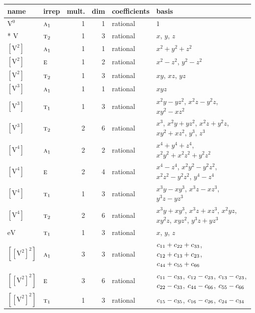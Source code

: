 \documentclass[10pt,a4paper]{article}
\numberwithin{equation}{section}
\newcommand{\irr}[1]{\text{\normalfont\scshape #1}}
\newcommand{\jahn}[1]{\mathrm{#1}}
\newlength{\fillwidth}\newlength{\cellwidth}\newlength{\colwidth}
\newcommand{\signbreak}{\penalty100\relax}
\begin{document}
{\begin{longtable}{@{}llrrl>{\RaggedRight\arraybackslash}p{\fillwidth}@{}}
name & irrep & mult. & dim & coefficients & basis\\\midrule\endhead
\bottomrule\endfoot\endlastfoot
$\jahn{V^{0}}$ & $\irr{a}_{1}$ & 1 & 1 & rational & $1$\\*
$\jahn{V}$ & $\irr{t}_{2}$ & 1 & 3 & rational & $x$, $y$, $z$\\
$\jahn{[V^{2}]}$ & $\irr{a}_{1}$ & 1 & 1 & rational & $x^{2} + y^{2} + z^{2}$\\
$\jahn{[V^{2}]}$ & $\irr{e}$ & 1 & 2 & rational & $x^{2} - z^{2}$, $y^{2} - z^{2}$\\
$\jahn{[V^{2}]}$ & $\irr{t}_{2}$ & 1 & 3 & rational & $xy$, $xz$, $yz$\\
$\jahn{[V^{3}]}$ & $\irr{a}_{1}$ & 1 & 1 & rational & $xyz$\\
$\jahn{[V^{3}]}$ & $\irr{t}_{1}$ & 1 & 3 & rational & $x^{2}y - yz^{2}$, $x^{2}z - y^{2}z$, $xy^{2} - xz^{2}$\\
$\jahn{[V^{3}]}$ & $\irr{t}_{2}$ & 2 & 6 & rational & $x^{3}$, $x^{2}y + yz^{2}$, $x^{2}z + y^{2}z$, $xy^{2} + xz^{2}$, $y^{3}$, $z^{3}$\\
$\jahn{[V^{4}]}$ & $\irr{a}_{1}$ & 2 & 2 & rational & $x^{4} + y^{4} + z^{4}$, $x^{2}y^{2} + x^{2}z^{2} + y^{2}z^{2}$\\
$\jahn{[V^{4}]}$ & $\irr{e}$ & 2 & 4 & rational & $x^{4} - z^{4}$, $x^{2}y^{2} - y^{2}z^{2}$, $x^{2}z^{2} - y^{2}z^{2}$, $y^{4} - z^{4}$\\
$\jahn{[V^{4}]}$ & $\irr{t}_{1}$ & 1 & 3 & rational & $x^{3}y - xy^{3}$, $x^{3}z - xz^{3}$, $y^{3}z - yz^{3}$\\
$\jahn{[V^{4}]}$ & $\irr{t}_{2}$ & 2 & 6 & rational & $x^{3}y + xy^{3}$, $x^{3}z + xz^{3}$, $x^{2}yz$, $xy^{2}z$, $xyz^{2}$, $y^{3}z + yz^{3}$\\
$\jahn{eV}$ & $\irr{t}_{1}$ & 1 & 3 & rational & $x$, $y$, $z$\\
$\jahn{[[V^{2}]^{2}]}$ & $\irr{a}_{1}$ & 3 & 3 & rational & $c_{11} +\signbreak c_{22} +\signbreak c_{33}$, $c_{12} +\signbreak c_{13} +\signbreak c_{23}$, $c_{44} +\signbreak c_{55} +\signbreak c_{66}$\\
$\jahn{[[V^{2}]^{2}]}$ & $\irr{e}$ & 3 & 6 & rational & $c_{11} -\signbreak c_{33}$, $c_{12} -\signbreak c_{23}$, $c_{13} -\signbreak c_{23}$, $c_{22} -\signbreak c_{33}$, $c_{44} -\signbreak c_{66}$, $c_{55} -\signbreak c_{66}$\\
$\jahn{[[V^{2}]^{2}]}$ & $\irr{t}_{1}$ & 1 & 3 & rational & $c_{15} -\signbreak c_{35}$, $c_{16} -\signbreak c_{26}$, $c_{24} -\signbreak c_{34}$\\

\end{longtable}}
\end{document}

